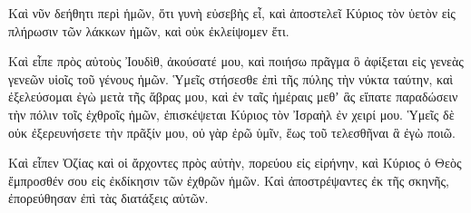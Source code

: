 {Καὶ νῦν δεήθητι περὶ ἡμῶν, ὅτι γυνὴ εὐσεβὴς εἶ, καὶ ἀποστελεῖ Κύριος τὸν ὑετὸν εἰς πλήρωσιν τῶν λάκκων ἡμῶν, καὶ οὐκ ἐκλείψομεν ἔτι.
\par }{\PP {}Καὶ εἶπε πρὸς αὐτοὺς Ἰουδὶθ, ἀκούσατέ μου, καὶ ποιήσω πρᾶγμα ὃ ἀφίξεται εἰς γενεὰς γενεῶν υἱοῖς τοῦ γένους ἡμῶν.
Ὑμεῖς στήσεσθε ἐπὶ τῆς πύλης τὴν νύκτα ταύτην, καὶ ἐξελεύσομαι ἐγὼ μετὰ τῆς ἅβρας μου, καὶ ἐν ταῖς ἡμέραις μεθʼ ἃς εἴπατε παραδώσειν τὴν πόλιν τοῖς ἐχθροῖς ἡμῶν, ἐπισκέψεται Κύριος τὸν Ἰσραὴλ ἐν χειρί μου.
Ὑμεῖς δὲ οὐκ ἐξερευνήσετε τὴν πρᾶξίν μου, οὐ γὰρ ἐρῶ ὑμῖν, ἕως τοῦ τελεσθῆναι ἃ ἐγὼ ποιῶ.
\par }{\PP {}Καὶ εἶπεν Ὀζίας καὶ οἱ ἄρχοντες πρὸς αὐτὴν, πορεύου εἰς εἰρήνην, καὶ Κύριος ὁ Θεὸς ἔμπροσθέν σου εἰς ἐκδίκησιν τῶν ἐχθρῶν ἡμῶν.
Καὶ ἀποστρέψαντες ἐκ τῆς σκηνῆς, ἐπορεύθησαν ἐπὶ τὰς διατάξεις αὐτῶν.

}

